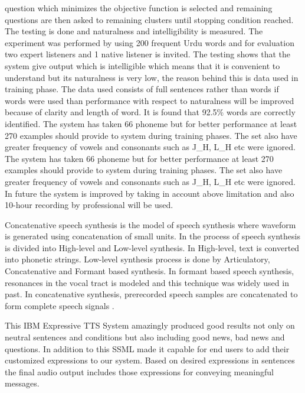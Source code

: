 question which minimizes the objective function is selected and remaining questions are then asked to remaining clusters
until stopping condition reached. The testing is done and naturalness and intelligibility is measured. The experiment was
performed by using 200 frequent Urdu words and for evaluation two expert listeners and 1 native listener is invited. The
testing shows that the system give output which is intelligible which means that it is convenient to understand but its
naturalness is very low, the reason behind this is data used in training phase. The data used consists of full sentences rather
than words if words were used than performance with respect to naturalness will be improved because of clarity and length of
word. It is found that 92.5\% words are correctly identified. The system has taken 66 phoneme but for better performance at
least 270 examples should provide to system during training phases. The set also have greater frequency of vowels and
consonants such as J\_H, L\_H etc were ignored. The system has taken 66 phoneme but for better performance at least 270
examples should provide to system during training phases. The set also have greater frequency of vowels and consonants
such as J\_H, L\_H etc were ignored. In future the system is improved by taking in account above limitation and also 10-hour
recording by professional will be used.

Concatenative speech synthesis is the model of speech synthesis where waveform is generated using concatenation of small units. In \cite{lemmetty1999review} the process of speech synthesis is divided into High-level and Low-level synthesis. In High-level, text is converted into phonetic strings. Low-level synthesis process is done by Articulatory, Concatenative and Formant based synthesis. In formant based speech synthesis, resonances in the vocal tract is modeled and this technique was widely used in
past. In concatenative synthesis, prerecorded speech samples are concatenated to form complete speech signals \cite{pickett1999acoustics}.

This IBM Expressive TTS System amazingly produced good results not only on neutral sentences and conditions but also
including good news, bad news and questions. In addition to this SSML made it capable for end users to add their customized
expressions to our system. Based on desired expressions in sentences the final audio output includes those expressions for
conveying meaningful messages.

